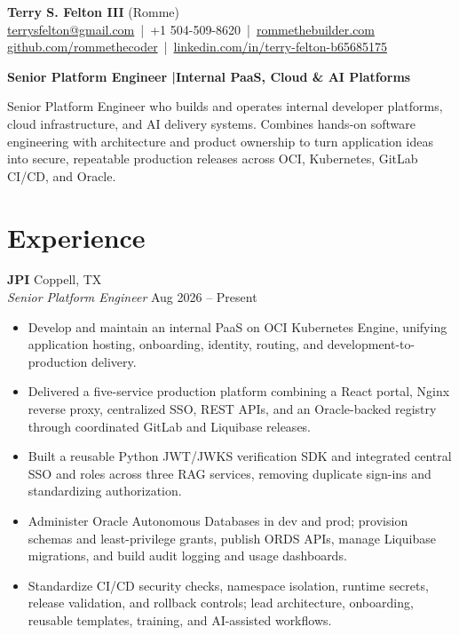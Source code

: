 \documentclass[10pt,letterpaper]{article}
\begin{document}
\fontsize{9.2}{10.5}\selectfont
\begin{center}
{\LARGE \textbf{Terry S. Felton III} \normalsize (Romme)}\\[-1pt]
\href{mailto:terrysfelton@gmail.com}{terrysfelton@gmail.com} \,|\, +1 504-509-8620 \,|\,
\href{https://rommethebuilder.com}{rommethebuilder.com}\\
\href{https://github.com/rommethecoder}{github.com/rommethecoder} \,|\,
\href{https://www.linkedin.com/in/terry-felton-b65685175/}{linkedin.com/in/terry-felton-b65685175}
\end{center}
\vspace{-3pt}
\begin{center}
{\normalsize\bfseries Senior Platform Engineer \enspace|\enspace Internal PaaS, Cloud \& AI Platforms}
\end{center}
\vspace{-3pt}

Senior Platform Engineer who builds and operates internal developer platforms, cloud infrastructure, and AI delivery systems. Combines hands-on software engineering with architecture and product ownership to turn application ideas into secure, repeatable production releases across OCI, Kubernetes, GitLab CI/CD, and Oracle.

\section*{Experience}
\textbf{JPI} \hfill Coppell, TX\\[-1pt]
\textit{Senior Platform Engineer} \hfill Aug 2026 -- Present
\begin{itemize}
  \item Develop and maintain an internal PaaS on OCI Kubernetes Engine, unifying application hosting, onboarding, identity, routing, and development-to-production delivery.
  \item Delivered a five-service production platform combining a React portal, Nginx reverse proxy, centralized SSO, REST APIs, and an Oracle-backed registry through coordinated GitLab and Liquibase releases.
  \item Built a reusable Python JWT/JWKS verification SDK and integrated central SSO and roles across three RAG services, removing duplicate sign-ins and standardizing authorization.
  \item Administer Oracle Autonomous Databases in dev and prod; provision schemas and least-privilege grants, publish ORDS APIs, manage Liquibase migrations, and build audit logging and usage dashboards.
  \item Standardize CI/CD security checks, namespace isolation, runtime secrets, release validation, and rollback controls; lead architecture, onboarding, reusable templates, training, and AI-assisted workflows.
\end{itemize}
\end{document}
